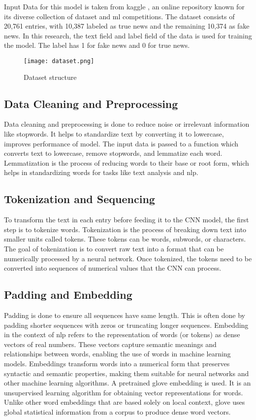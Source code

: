 Input Data for this model is taken from kaggle \cite{fake-news-dataset}, an online repository known for its diverse collection of dataset and \ac{ml} competitions. The dataset consists of 20,761 entries, with 10,387 labeled as true news and the remaining 10,374 as fake news. In this research, the text field and label field of the data is used for training the model. The label has 1 for fake news and 0 for true news.

\begin{figure}[h]
    \centering
    \texttt{[image: dataset.png]}
    \caption{Dataset structure}
    \label{fig:Dataset structure}
\end{figure}

\subsection{Data Cleaning and Preprocessing}

Data cleaning and preprocessing is done to reduce noise or irrelevant information like stopwords. It helps to standardize text by converting it to lowercase, improves performance of model. The input data is passed to a function which converts text to lowercase, remove stopwords, and lemmatize each word. Lemmatization is the process of reducing words to their base or root form, which helps in standardizing words for tasks like text analysis and \ac{nlp}.

\subsection{Tokenization and Sequencing}

To transform the text in each entry before feeding it to the CNN model, the first step is to tokenize words. Tokenization is the process of breaking down text into smaller units called tokens. These tokens can be words, subwords, or characters. The goal of tokenization is to convert raw text into a format that can be numerically processed by a neural network. Once tokenized, the tokens need to be converted into sequences of numerical values that the CNN can process.

\subsection{Padding and Embedding}

Padding is done to ensure all sequences have same length. This is often done by padding shorter sequences with zeros or truncating longer sequences. Embedding in the context of \ac{nlp} refers to the representation of words (or tokens) as dense vectors of real numbers. These vectors capture semantic meanings and relationships between words, enabling the use of words in machine learning models. Embeddings transform words into a numerical form that preserves syntactic and semantic properties, making them suitable for neural networks and other machine learning algorithms. A pretrained \ac{glove} embedding is used. It is an unsupervised learning algorithm for obtaining vector representations for words. Unlike other word embeddings that are based solely on local context, \ac{glove} uses global statistical information from a corpus to produce dense word vectors.

